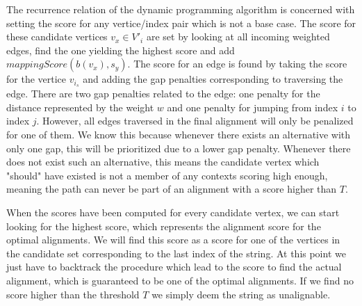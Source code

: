 \documentclass[thesis.tex]{subfiles}
\begin{document}
\par\noindent
The recurrence relation of the dynamic programming algorithm is concerned with setting the score for any vertice/index pair which is not a base case. The score for these candidate vertices $v_x \in V'_i$ are set by looking at all incoming weighted edges, find the one yielding the highest score and add $mappingScore(b(v_x), s_y)$. The score for an edge is found by taking the score for the vertice $v_{i_s}$ and adding the gap penalties corresponding to traversing the edge. There are two gap penalties related to the edge: one penalty for the distance represented by the weight $w$ and one penalty for jumping from index $i$ to index $j$. However, all edges traversed in the final alignment will only be penalized for one of them. We know this because whenever there exists an alternative with only one gap, this will be prioritized due to a lower gap penalty. Whenever there does not exist such an alternative, this means the candidate vertex which "should" have existed is not a member of any contexts scoring high enough, meaning the path can never be part of an alignment with a score higher than $T$.\\
\par\noindent
When the scores have been computed for every candidate vertex, we can start looking for the highest score, which represents the alignment score for the optimal alignments. We will find this score as a score for one of the vertices in the candidate set corresponding to the last index of the string. At this point we just have to backtrack the procedure which lead to the score to find the actual alignment, which is guaranteed to be one of the optimal alignments. If we find no score higher than the threshold $T$ we simply deem the string as unalignable.
\end{document}
